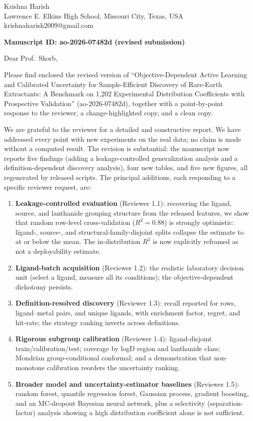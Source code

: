 \documentclass[11pt]{article}
\begin{document}
\pagestyle{empty}

\noindent Krishna Harish\\
Lawrence E. Elkins High School, Missouri City, Texas, USA\\
krishnaharish2009@gmail.com

\vspace{1em}
\noindent\textbf{Manuscript ID: ao-2026-07482d (revised submission)}

\vspace{1em}
\noindent Dear Prof.\ Skorb,

Please find enclosed the revised version of ``Objective-Dependent Active Learning and
Calibrated Uncertainty for Sample-Efficient Discovery of Rare-Earth Extractants: A
Benchmark on 1{,}202 Experimental Distribution Coefficients with Prospective
Validation'' (ao-2026-07482d), together with a point-by-point response to the reviewer,
a change-highlighted copy, and a clean copy.

We are grateful to the reviewer for a detailed and constructive report. We have
addressed every point with new experiments on the real data; no claim is made without a
computed result. The revision is substantial: the manuscript now reports five findings
(adding a leakage-controlled generalization analysis and a definition-dependent
discovery analysis), four new tables, and five new figures, all regenerated by released
scripts. The principal additions, each responding to a specific reviewer request, are:

\begin{enumerate}
\item \textbf{Leakage-controlled evaluation} (Reviewer 1.1): recovering the ligand,
source, and lanthanide grouping structure from the released features, we show that
random row-level cross-validation ($R^2=0.88$) is strongly optimistic: ligand-, source-,
and structural-family-disjoint splits collapse the estimate to at or below the mean. The
in-distribution $R^2$ is now explicitly reframed as not a deployability estimate.
\item \textbf{Ligand-batch acquisition} (Reviewer 1.2): the realistic laboratory
decision unit (select a ligand, measure all its conditions); the objective-dependent
dichotomy persists.
\item \textbf{Definition-resolved discovery} (Reviewer 1.3): recall reported for rows,
ligand--metal pairs, and unique ligands, with enrichment factor, regret, and hit-rate;
the strategy ranking inverts across definitions.
\item \textbf{Rigorous subgroup calibration} (Reviewer 1.4): ligand-disjoint
train/calibration/test; coverage by logD region and lanthanide class; Mondrian
group-conditional conformal; and a demonstration that non-monotone calibration reorders
the uncertainty ranking.
\item \textbf{Broader model and uncertainty-estimator baselines} (Reviewer 1.5): random
forest, quantile regression forest, Gaussian process, gradient boosting, and an
MC-dropout Bayesian neural network, plus a selectivity (separation-factor) analysis
showing a high distribution coefficient alone is not sufficient.
\end{enumerate}
\end{document}
